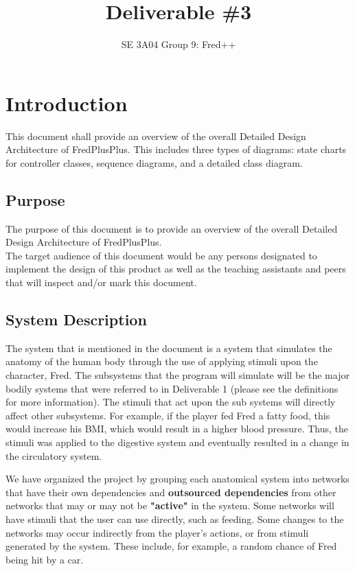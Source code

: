 \documentclass[]{article}
\title{Deliverable \#3}
\author{SE 3A04 Group 9: Fred++}
\date{}
\begin{document}
\maketitle	


\section{Introduction}
\label{sec:introduction}


This document shall provide an overview of the overall Detailed Design Architecture of FredPlusPlus. This includes three types of diagrams: state charts for controller classes, sequence diagrams, and a detailed class diagram.




\subsection*{Purpose}
\label{sub:purpose}

The purpose of this document is to provide an overview of the overall Detailed Design Architecture of FredPlusPlus.\\
The target audience of this document would be any persons designated to implement the design of this product as well as the teaching assistants and peers that will
inspect and/or mark this document.

\subsection*{System Description}
\label{sub:system_description}
The system that is mentioned in the document is a system that simulates the anatomy of the human body through the use of applying stimuli upon the character, Fred. The subsystems that the program will simulate will be the major bodily systems that were referred to in Deliverable 1 (please see the definitions for more information). The stimuli that act upon the sub systems will directly affect other subsystems. For example, if the player fed Fred a fatty food, this would increase his BMI, which would result in a higher blood pressure. Thus, the stimuli was applied to the digestive system and eventually resulted in a change in the circulatory system.
	
We have organized the project by grouping each anatomical system into networks that have their own dependencies and \textbf{outsourced dependencies} from other networks that may or may not be \textbf{"active"} in the system. Some networks will have stimuli that
the user can use directly, such as feeding. Some changes to the networks may occur indirectly from the player's actions, or from stimuli generated by the system. These include, for example, a random chance of Fred being hit by a car.
\end{document}
